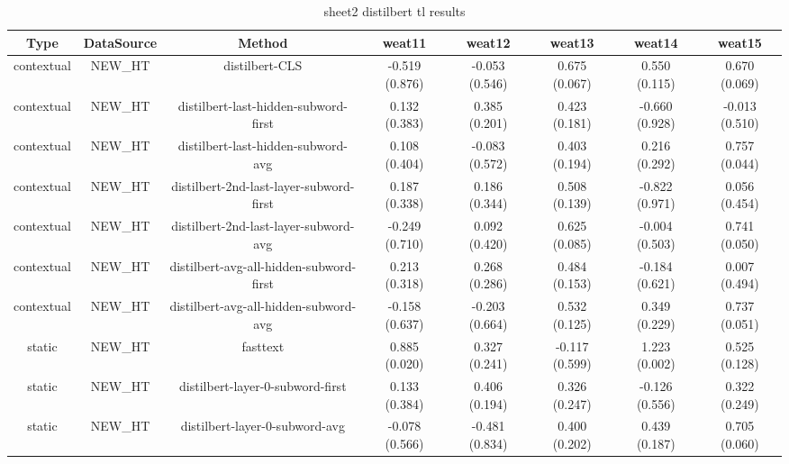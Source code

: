 \begin{sidewaystable}[htb]
    \centering
    \caption{sheet2 distilbert tl results}
    \label{appendix_tab:sheet2_distilbert_tl_results}
    \small
    \begin{tabular}{@{}cccccccc@{}}
        \toprule
        Type & DataSource & Method & weat11 & weat12 & weat13 & weat14 & weat15 \\
        \midrule
        contextual & NEW\_HT & distilbert-CLS & -0.519 (0.876) & -0.053 (0.546) & 0.675 (0.067) & 0.550 (0.115) & 0.670 (0.069) \\
        contextual & NEW\_HT & distilbert-last-hidden-subword-first & 0.132 (0.383) & 0.385 (0.201) & 0.423 (0.181) & -0.660 (0.928) & -0.013 (0.510) \\
        contextual & NEW\_HT & distilbert-last-hidden-subword-avg & 0.108 (0.404) & -0.083 (0.572) & 0.403 (0.194) & 0.216 (0.292) & 0.757 (0.044) \\
        contextual & NEW\_HT & distilbert-2nd-last-layer-subword-first & 0.187 (0.338) & 0.186 (0.344) & 0.508 (0.139) & -0.822 (0.971) & 0.056 (0.454) \\
        contextual & NEW\_HT & distilbert-2nd-last-layer-subword-avg & -0.249 (0.710) & 0.092 (0.420) & 0.625 (0.085) & -0.004 (0.503) & 0.741 (0.050) \\
        contextual & NEW\_HT & distilbert-avg-all-hidden-subword-first & 0.213 (0.318) & 0.268 (0.286) & 0.484 (0.153) & -0.184 (0.621) & 0.007 (0.494) \\
        contextual & NEW\_HT & distilbert-avg-all-hidden-subword-avg & -0.158 (0.637) & -0.203 (0.664) & 0.532 (0.125) & 0.349 (0.229) & 0.737 (0.051) \\
        static & NEW\_HT & fasttext & 0.885 (0.020) & 0.327 (0.241) & -0.117 (0.599) & 1.223 (0.002) & 0.525 (0.128) \\
        static & NEW\_HT & distilbert-layer-0-subword-first & 0.133 (0.384) & 0.406 (0.194) & 0.326 (0.247) & -0.126 (0.556) & 0.322 (0.249) \\
        static & NEW\_HT & distilbert-layer-0-subword-avg & -0.078 (0.566) & -0.481 (0.834) & 0.400 (0.202) & 0.439 (0.187) & 0.705 (0.060) \\
        \bottomrule
    \end{tabular}
\end{sidewaystable}
